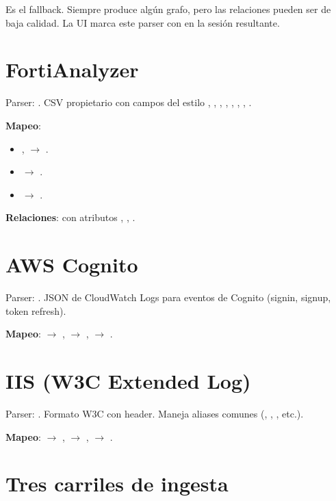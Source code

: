 Es el fallback. Siempre produce algún grafo, pero las relaciones
pueden ser de baja calidad. La UI marca este parser con
 en la sesión resultante.

\section{FortiAnalyzer}

Parser: . CSV propietario
con campos del estilo , , ,
, , , ,
.

\textbf{Mapeo}:
\begin{itemize}
    \item {},  $\to$ .
    \item {} $\to$ .
    \item {} $\to$ .
\end{itemize}

\textbf{Relaciones}:  con atributos
, , .

\section{AWS Cognito}

Parser: . JSON de
CloudWatch Logs para eventos de Cognito (signin, signup, token
refresh).

\textbf{Mapeo}:  $\to$ , 
$\to$ ,  $\to$ .

\section{IIS (W3C Extended Log)}

Parser: . Formato W3C con
 header. Maneja aliases comunes
(, , , etc.).

\textbf{Mapeo}:  $\to$ , 
$\to$ ,  $\to$ .

\section{Tres carriles de ingesta}
\label{sec:log-three-lanes}

